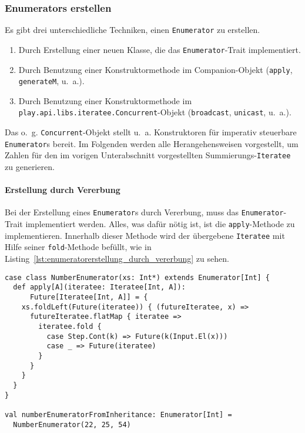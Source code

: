 \subsubsection{Enumerators erstellen} %
\label{ssub:enumerators_erstellen}

Es gibt drei unterschiedliche Techniken, einen \lstinline|Enumerator| zu erstellen.
\begin{enumerate}
  \item Durch Erstellung einer neuen Klasse, die das \lstinline|Enumerator|-Trait implementiert.
  \item Durch Benutzung einer Konstruktormethode im Companion-Objekt (\lstinline|apply|, \lstinline|generateM|, u.~a.).
  \item Durch Benutzung einer Konstruktormethode im \lstinline|play.api.libs.iteratee.Concurrent|-Objekt (\lstinline|broadcast|, \lstinline|unicast|, u.~a.).
\end{enumerate}

Das o.~g. \lstinline|Concurrent|-Objekt stellt u.~a. Konstruktoren für imperativ steuerbare \lstinline|Enumerator|s bereit.
Im Folgenden werden alle Herangehensweisen vorgestellt, um Zahlen für den im vorigen Unterabschnitt vorgestellten Summierungs-\lstinline|Iteratee| zu generieren.

\paragraph{Erstellung durch Vererbung} %
\label{par:enumeratorerstellung_durch_vererbung}\mbox{} %

Bei der Erstellung eines \lstinline|Enumerator|s durch Vererbung, muss das \lstinline|Enumerator|-Trait implementiert werden.
Alles, was dafür nötig ist, ist die \lstinline|apply|-Methode zu implementieren.
Innerhalb dieser Methode wird der übergebene \lstinline|Iteratee| mit Hilfe seiner \lstinline|fold|-Methode befüllt, wie in Listing~\ref{lst:enumeratorerstellung_durch_vererbung} zu sehen.

\begin{lstlisting}[caption=Erstellung eines Enumerators durch Vererbung, label=lst:enumeratorerstellung_durch_vererbung]
case class NumberEnumerator(xs: Int*) extends Enumerator[Int] {
  def apply[A](iteratee: Iteratee[Int, A]):
      Future[Iteratee[Int, A]] = {
    xs.foldLeft(Future(iteratee)) { (futureIteratee, x) =>
      futureIteratee.flatMap { iteratee =>
        iteratee.fold {
          case Step.Cont(k) => Future(k(Input.El(x)))
          case _ => Future(iteratee)
        }
      }
    }
  }
}

val numberEnumeratorFromInheritance: Enumerator[Int] =
  NumberEnumerator(22, 25, 54)
\end{lstlisting}

